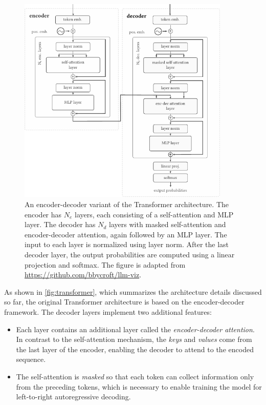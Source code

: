 {\begin{figure}[ht]
    \centering
    \includegraphics[width=0.9\textwidth]{img/transformer.pdf}
    \caption{An encoder-decoder variant of the Transformer architecture. The encoder has $N_{e}$ layers, each consisting of a self-attention and MLP layer. The decoder has $N_{d}$ layers with masked self-attention and encoder-decoder attention, again followed by an MLP layer. The input to each layer is normalized using layer norm. After the last decoder layer, the output probabilities are computed using a linear projection and softmax. The figure is adapted from \href{https://github.com/bbycroft/llm-viz/blob/main/src/llm/intro-image.svg}{https://github.com/bbycroft/llm-viz}.}
    \label{fig:transformer}
\end{figure}



As shown in \autoref{fig:transformer}, which summarizes the architecture details discussed so far, the original Transformer architecture is based on the encoder-decoder framework. The decoder layers implement two additional features:
\begin{itemize}
    \item Each layer contains an additional layer called the \emph{encoder-decoder attention}. In contrast to the self-attention mechanism, the \emph{keys} and \emph{values} come from the last layer of the encoder, enabling the decoder to attend to the encoded sequence.
    \item The self-attention is \emph{masked} so that each token can collect information only from the preceding tokens, which is necessary to enable training the model for left-to-right autoregressive decoding.
\end{itemize}

}
